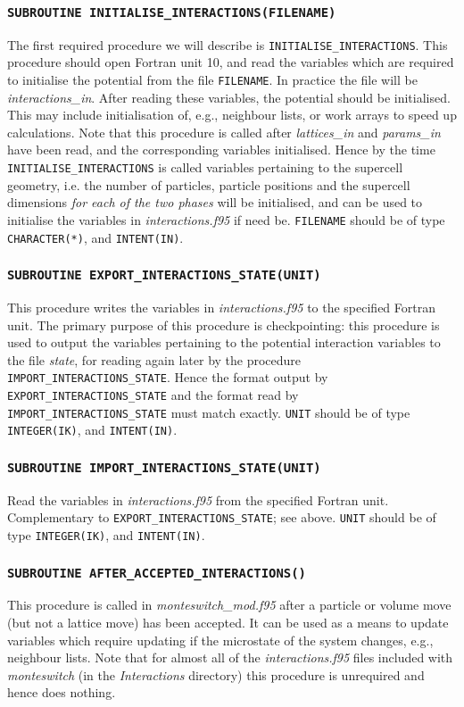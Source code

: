 \documentclass{report}
\begin{document}
\subsubsection{\texttt{SUBROUTINE INITIALISE\_INTERACTIONS(FILENAME)}}
The first required procedure we will describe is \verb|INITIALISE_INTERACTIONS|. This procedure should open Fortran unit 10, and read 
the variables which are required to initialise the potential from the file \verb|FILENAME|.
In practice the file will be \emph{interactions\_in}. After reading these variables, the potential should be initialised. This may include
initialisation of, e.g., neighbour lists, or work arrays to speed up calculations. Note that this procedure is called after \emph{lattices\_in}
and \emph{params\_in} have been read, and the corresponding variables initialised. Hence by the time \verb|INITIALISE_INTERACTIONS| is called 
variables pertaining to the supercell geometry, i.e. the number of particles, particle positions and the supercell dimensions 
\emph{for each of the two phases} will be initialised, and can be used to initialise the variables in \emph{interactions.f95} if need be.
\verb|FILENAME| should be of type \verb|CHARACTER(*)|, and \verb|INTENT(IN)|.

\subsubsection{\texttt{SUBROUTINE EXPORT\_INTERACTIONS\_STATE(UNIT)}}
This procedure writes the variables in \emph{interactions.f95} to the specified Fortran unit. The primary purpose of this procedure is checkpointing: 
this procedure is used to output the variables pertaining to the potential interaction variables to the file \emph{state}, for reading again later
by the procedure \verb|IMPORT_INTERACTIONS_STATE|. Hence the format output by \verb|EXPORT_INTERACTIONS_STATE| and the format read by 
\verb|IMPORT_INTERACTIONS_STATE| must match exactly. \verb|UNIT| should be of type \verb|INTEGER(IK)|, and \verb|INTENT(IN)|.

\subsubsection{\texttt{SUBROUTINE IMPORT\_INTERACTIONS\_STATE(UNIT)}}
Read the variables in \emph{interactions.f95} from the specified Fortran unit. Complementary to \verb|EXPORT_INTERACTIONS_STATE|; see 
above. \verb|UNIT| should be of type \verb|INTEGER(IK)|, and \verb|INTENT(IN)|.

\subsubsection{\texttt{SUBROUTINE AFTER\_ACCEPTED\_INTERACTIONS()}}
This procedure is called in \emph{monteswitch\_mod.f95} after a particle or volume move (but not a lattice move) has been accepted. It can be used 
as a means to update variables which require updating if the microstate of the system changes, e.g., neighbour lists. Note that for almost all of
the \emph{interactions.f95} files included with \emph{monteswitch} (in the \emph{Interactions} directory) this procedure is unrequired and hence
does nothing.
\end{document}
